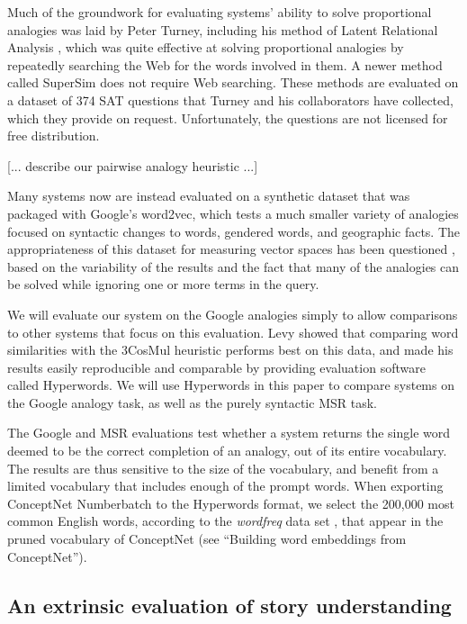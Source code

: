 \documentclass[letterpaper]{article}
\begin{document}
Much of the groundwork for evaluating systems' ability to solve proportional
analogies was laid by Peter Turney, including his method of Latent Relational
Analysis \cite{turney2005lra}, which was quite effective at solving
proportional analogies by repeatedly searching the Web for the words involved
in them.  A newer method called SuperSim \cite{turney2013distributional} does
not require Web searching. These methods are evaluated on a dataset of 374 SAT
questions that Turney and his collaborators have collected, which they provide
on request.  Unfortunately, the questions are not licensed for free
distribution.

[... describe our pairwise analogy heuristic ...]

Many systems now are instead evaluated on a synthetic dataset that was packaged
with Google's word2vec, which tests a much smaller variety of analogies focused
on syntactic changes to words, gendered words, and geographic facts. The
appropriateness of this dataset for measuring vector spaces has been questioned
\cite{linzen2016issues}, based on the variability of the results and the fact
that many of the analogies can be solved while ignoring one or more terms in
the query.

We will evaluate our system on the Google analogies simply to allow comparisons
to other systems that focus on this evaluation. Levy showed that comparing word
similarities with the 3CosMul heuristic \cite{levy2015embeddings} performs best
on this data, and made his results easily reproducible and comparable by
providing evaluation software called Hyperwords. We will use Hyperwords in this
paper to compare systems on the Google analogy task, as well as the purely
syntactic MSR task.

The Google and MSR evaluations test whether a system returns the single word
deemed to be the correct completion of an analogy, out of its entire
vocabulary. The results are thus sensitive to the size of the vocabulary, and
benefit from a limited vocabulary that includes enough of the prompt words.
When exporting ConceptNet Numberbatch to the Hyperwords format, we select the
200,000 most common English words, according to the \emph{wordfreq} data set
\cite{speer2016wordfreq}, that appear in the pruned vocabulary of ConceptNet
(see ``Building word embeddings from ConceptNet'').

\subsection{An extrinsic evaluation of story understanding}
\label{extrinsic-evaluation}
\end{document}

